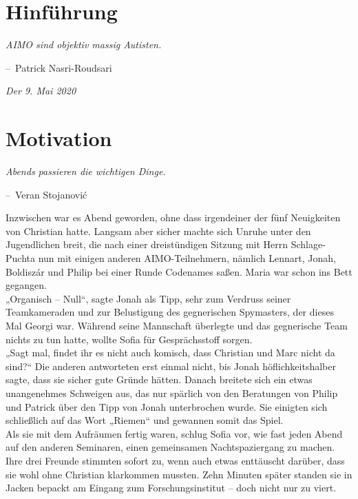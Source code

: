 \documentclass[oneside]{memoir}
\makeatletter
\newenvironment{chapquote}[2][2em]
  {\setlength{\@tempdima}{#1}%
   \def\chapquote@author{#2}%
   \parshape 1 \@tempdima \dimexpr\textwidth-2\@tempdima\relax%
   \itshape}
  {\par\normalfont\hfill--\ \chapquote@author\hspace*{\@tempdima}\par\bigskip}
\makeatother
\begin{document}
\chapter{Hinführung} %
\begin{chapquote}{Patrick Nasri-Roudsari}
\glqq AIMO sind objektiv massig Autisten.\grqq
\end{chapquote}
     \textit{Der 9. Mai 2020} \\
\chapter{Motivation} %
\begin{chapquote}{Veran Stojanović}
\glqq Abends passieren die wichtigen Dinge.\grqq
\end{chapquote}
Inzwischen war es Abend geworden, ohne dass irgendeiner der fünf Neuigkeiten von Christian hatte. Langsam aber sicher machte sich Unruhe unter den Jugendlichen breit, die nach einer dreistündigen Sitzung mit Herrn Schlage-Puchta nun mit einigen anderen AIMO-Teilnehmern, nämlich Lennart, Jonah, Boldiszár und Philip bei einer Runde Codenames saßen. Maria war schon ins Bett gegangen. \\
„Organisch – Null“, sagte Jonah als Tipp, sehr zum Verdruss seiner Teamkameraden und zur Belustigung des gegnerischen Spymasters, der dieses Mal Georgi war.
Während seine Mannschaft überlegte und das gegnerische Team nichts zu tun hatte, wollte Sofia für Gesprächsstoff sorgen. \\
„Sagt mal, findet ihr es nicht auch komisch, dass Christian und Marc nicht da sind?“
Die anderen antworteten erst einmal nicht, bis Jonah höflichkeitshalber sagte, dass sie sicher gute Gründe hätten. Danach breitete sich ein etwas unangenehmes Schweigen aus, das nur spärlich von den Beratungen von Philip und Patrick über den Tipp von Jonah unterbrochen wurde. Sie einigten sich schließlich auf das Wort „Riemen“ und gewannen somit das Spiel. \\
Als sie mit dem Aufräumen fertig waren, schlug Sofia vor, wie fast jeden Abend auf den anderen Seminaren, einen gemeinsamen Nachtspaziergang zu machen. Ihre drei Freunde stimmten sofort zu, wenn auch etwas enttäuscht darüber, dass sie wohl ohne Christian klarkommen mussten. Zehn Minuten später standen sie in Jacken bepackt am Eingang zum Forschungsinstitut – doch nicht nur zu viert. \\
\end{document}
